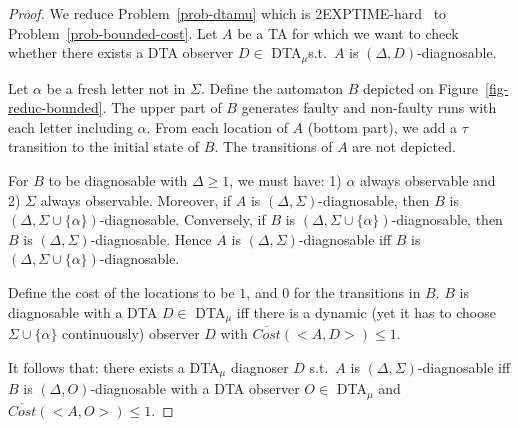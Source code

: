 \documentclass[letterpaper,10pt,conference]{ieeeconf}  \IEEEoverridecommandlockouts                              \overrideIEEEmargins
\def\st{{s.t.}~}
\def\Cost{\textit{Cost}}
\def\MeanCost{\textit{$\overline{\Cost}$}}
\def\tauac{\tau}
\def\dtamu{DTA$_\mu$\xspace}
\begin{document}
\begin{proof}
  We reduce Problem~\ref{prob-dtamu} which is
  2EXPTIME-hard~\cite{Bouyerfossacs05} to Problem~\ref{prob-bounded-cost}.
  Let $A$ be a TA for which we want to check whether there exists a
  DTA observer $D \in$ \dtamu \st $A$ is $(\Delta,D)$-diagnosable.

  Let $\alpha$ be a fresh letter not in $\Sigma$.  Define the
  automaton $B$ depicted on Figure~\ref{fig-reduc-bounded}.  The
  upper part of $B$ generates faulty and non-faulty runs with each
  letter including $\alpha$.  From each location of $A$ (bottom part),
  we add a $\tauac$ transition to the initial state of $B$.  The
  transitions of $A$ are not depicted.
  
  For $B$ to be diagnosable with $\Delta \geq 1$, we must have: 1)
  $\alpha$ always observable and 2) $\Sigma$ always observable.
  Moreover, if $A$ is $(\Delta,\Sigma)$-diagnosable, then $B$ is
  $(\Delta,\Sigma\cup\{\alpha\})$-diagnosable. Conversely, if $B$ is
  $(\Delta,\Sigma\cup\{\alpha\})$-diagnosable, then $B$ is
  $(\Delta,\Sigma)$-diagnosable.  Hence $A$ is
  $(\Delta,\Sigma)$-diagnosable iff $B$ is
  $(\Delta,\Sigma\cup\{\alpha\})$-diagnosable.

  Define the cost of the locations to be $1$, and $0$ for the
  transitions in $B$.  $B$ is diagnosable with a DTA $D \in$ \dtamu
  iff there is a dynamic (yet it has to choose $\Sigma\cup\{\alpha\}$
  continuously) observer $D$ with $\MeanCost(<\!A,D\!>) \leq 1$.
  
  It follows that: there exists a \dtamu diagnoser $D$ \st $A$ is
  $(\Delta,\Sigma)$-diagnosable iff $B$ is $(\Delta,O)$-diagnosable
  with a DTA observer $O \in$ \dtamu and $\MeanCost(<\!A,O\!>) \leq 1$.
\end{proof}
\end{document}
